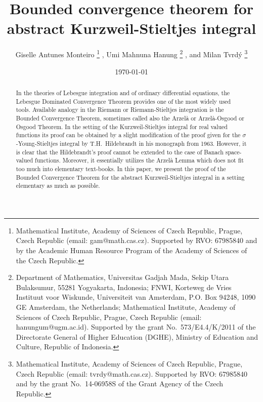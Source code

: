 \documentclass[12pt,twoside]{article}
\numberwithin{equation}{section}
\theoremstyle{plain}
\theoremstyle{definition}
\begin{document}
\newcommand{\dd}{\hskip0.2mm\mbox{\rm d}}
\newcommand{\N}{{\mathbb N}}
\newcommand{\R}{{\mathbb R}}
\newcommand{\dis}{\displaystyle}
\newcommand{\ab}{[a,b\,]}
\newcommand{\ia}{\noalign{\noindent{and}}}
\newcommand{\eps}{\varepsilon}
\newcommand{\inn}{\,{\in}\,}
\def\skipaline{\removelastskip\vskip10pt plus 1pt minus 1pt}
\def\skiphalfaline{\removelastskip\vskip5pt plus 1pt minus 1pt}


\title{Bounded convergence theorem for abstract Kurzweil-Stieltjes integral}

\author{
Giselle Antunes Monteiro
\hskip-1mm\thanks{Mathematical Institute, Academy of Sciences of Czech Republic, Prague, Czech Republic
(email: gam@math.cas.cz). Supported by RVO: 67985840 and by the Academic Human Resource Program
of the Academy of Sciences of the Czech Republic.}\,\,,
Umi Mahnuna Hanung
\hskip-1mm\thanks{Department of Mathematics, Universitas Gadjah Mada, Sekip Utara Bulaksumur,
55281 Yogyakarta, Indonesia;
FNWI, Korteweg de Vries Instituut voor Wiskunde, Universiteit van Amsterdam, P.O. Box 94248,
1090 GE Amsterdam, the Netherlands;
Mathematical Institute, Academy of Sciences of Czech Republic, Prague, Czech Republic
(email:  hanungum@ugm.ac.id).
Supported by the grant No.~573/E4.4/K/2011 of the Directorate General of Higher Education (DGHE),
Ministry of Education and Culture, Republic of Indonesia.}\,\,,
and Milan Tvrd\'y
\hskip-1mm\thanks{Mathematical Institute, Academy of Sciences of Czech Republic, Prague, Czech Republic
(email: tvrdy@math.cas.cz). Supported by RVO: 67985840 and by the grant No.~14-06958S of the Grant
Agency of the Czech Republic.}}
\date{\today}
\maketitle

\begin{abstract} %
In the theories of Lebesgue integration and of ordinary differential equations, the Lebesgue
Dominated Convergence Theorem provides one of the most widely used tools. Available analogy
in the Riemann or Riemann-Stieltjes integration is the Bounded Convergence Theorem, sometimes
called also the Arzel\`a or Arzel\`a-Osgood or Osgood Theorem. In the setting of the Kurzweil-Stieltjes
integral for real valued functions its proof can be obtained by a slight modification of the proof
given for the $\sigma$-Young-Stieltjes integral by T.H.~Hildebrandt in his monograph from 1963.
However, it is clear that the Hildebrandt's proof cannot be extended to the case of Banach space-valued
functions. Moreover, it essentially utilizes the Arzel\`a Lemma which does not fit too much into
elementary text-books. In this paper, we present the proof of the Bounded Convergence Theorem for
the abstract Kurzweil-Stieltjes integral in a setting elementary as much as possible.
\end{abstract}
\end{document}
